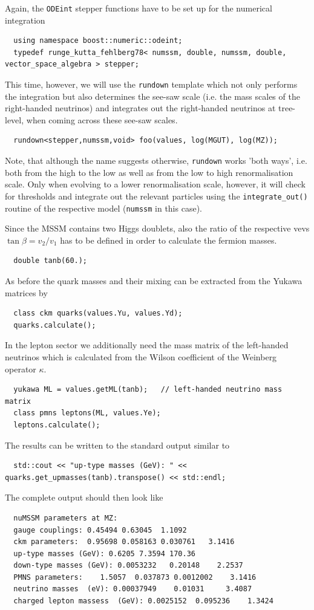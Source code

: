 \documentclass[11pt,a4paper]{article}
\begin{document}
Again, the \texttt{ODEint} stepper functions have to be set up for the numerical integration
\begin{lstlisting}
  using namespace boost::numeric::odeint;
  typedef runge_kutta_fehlberg78< numssm, double, numssm, double, vector_space_algebra > stepper;
\end{lstlisting}
This time, however, we will use the \texttt{rundown} template which not only performs the integration but also determines the see-saw scale (i.e. the mass scales of the right-handed neutrinos) and integrates out the right-handed neutrinos at tree-level, when coming across these see-saw scales.
\begin{lstlisting}
  rundown<stepper,numssm,void> foo(values, log(MGUT), log(MZ));
\end{lstlisting}
Note, that although the name suggests otherwise, \texttt{rundown} works 'both ways', i.e. both from the high to the low as well as from the low to high renormalisation scale. Only when evolving to a lower renormalisation scale, however, it will check for thresholds and integrate out the relevant particles using the \texttt{integrate\_out()} routine of the respective model (\texttt{numssm} in this case).
  
Since the MSSM contains two Higgs doublets, also the ratio of the respective vevs $\tan\beta = v_2 / v_1$ has to be defined in order to calculate the fermion masses.
\begin{lstlisting}
  double tanb(60.);
\end{lstlisting}
As before the quark masses and their mixing can be extracted from the Yukawa matrices by
\begin{lstlisting}
  class ckm quarks(values.Yu, values.Yd);
  quarks.calculate();
\end{lstlisting}
In the lepton sector we additionally need the mass matrix of the left-handed neutrinos which is calculated from the Wilson coefficient of the Weinberg operator $\kappa$.
\begin{lstlisting}
  yukawa ML = values.getML(tanb);   // left-handed neutrino mass matrix
  class pmns leptons(ML, values.Ye);
  leptons.calculate();
\end{lstlisting}
The results can be written to the standard output similar to
\begin{lstlisting}
  std::cout << "up-type masses (GeV): " << quarks.get_upmasses(tanb).transpose() << std::endl;
\end{lstlisting}    
The complete output should then look like
\begin{lstlisting}
  nuMSSM parameters at MZ:
  gauge couplings: 0.45494 0.63045  1.1092
  ckm parameters:  0.95698 0.058163 0.030761   3.1416
  up-type masses (GeV): 0.6205 7.3594 170.36
  down-type masses (GeV): 0.0053232   0.20148    2.2537
  PMNS parameters:    1.5057  0.037873 0.0012002    3.1416
  neutrino masses  (eV): 0.00037949    0.01031     3.4087
  charged lepton massess  (GeV): 0.0025152  0.095236    1.3424
\end{lstlisting}    
\end{document}

